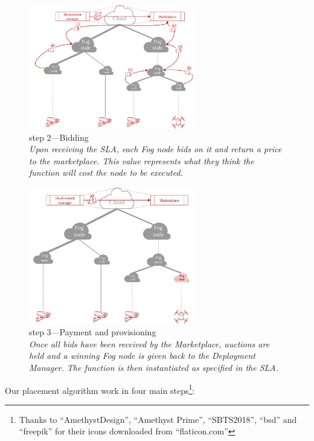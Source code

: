 \begin{figure}[H]
	\centering
	\includegraphics[width=0.65\textwidth]{./assets/OurPlacementOriginal-Page-3.png}
	\caption[step 2—Bidding]{step 2—Bidding\\
		\textit{Upon receiving the \gls{SLA}, each Fog node bids on it and return a price to the marketplace. This value represents what they think the function will cost the node to be executed.}}
	\label{fig:our_placement2}
\end{figure}
\begin{figure}[H]
	\centering
	\includegraphics[width=0.65\textwidth]{./assets/OurPlacementOriginal-Page-4.png}
	\caption[Step 3—Payment and provisioning]{step 3—Payment and provisioning\\
		\textit{Once all bids have been received by the Marketplace, auctions are held and a winning Fog node is given back to the Deployment Manager. The function is then instantiated as specified in the \gls{SLA}.}}
	\label{fig:our_placement3}
\end{figure}

Our placement algorithm work in four main steps\footnote{Thanks to “AmethystDesign”, “Amethyst Prime”, “SBTS2018”, “bsd” and “freepik” for their icons downloaded from “flaticon.com”}:

